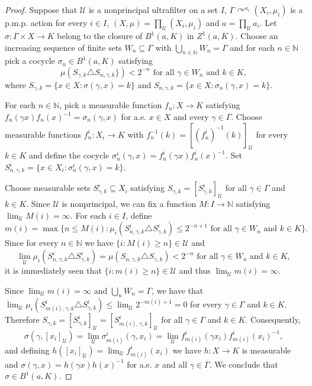 \documentclass[12pt]{amsart}
\theoremstyle{definition}
\def\u{\mathsf 1}
\newcommand\bN{{\mathbb N}}
\def \u{\mathcal U}
\newcommand{\pmp}{p{$.$}m{$.$}p{$.$}}
\newcommand{\acts}{\curvearrowright}
\newcommand{\symd}{\triangle}
\begin{document}
\begin{proof}
	Suppose that $\u$ is a nonprincipal ultrafilter on a set $I$, $\Gamma \acts^{a_i} (X_i, \mu_i)$ is a {\pmp} action for every $i \in I$, $(X, \mu) = \prod_\u (X_i, \mu_i)$ and $a = \prod_\u a_i$. Let $\sigma : \Gamma \times X \rightarrow K$ belong to the closure of $B^1(a, K)$ in $Z^1(a, K)$. Choose an increasing sequence of finite sets $W_n \subseteq \Gamma$ with $\bigcup_{n \in \bN} W_n = \Gamma$ and for each $n \in \bN$ pick a cocycle $\sigma_n \in B^1(a,K)$ satisfying
	$$ \mu(S_{\gamma,k} \symd S_{n,\gamma,k}\}) < 2^{-n} \text{ for all }\gamma \in W_n \text{ and } k \in K, $$
	where $S_{\gamma, k} = \{x \in X : \sigma(\gamma, x) = k\}$ and $S_{n,\gamma,k} = \{x \in X : \sigma_n(\gamma, x) = k\}$.
	
	For each $n \in \bN$, pick a measurable function $f_n : X \rightarrow K$ satisfying $f_n(\gamma x) f_n(x)^{-1} = \sigma_n(\gamma, x)$ for a.e. $x \in X$ and every $\gamma \in \Gamma$. Choose measurable functions $f_n^i : X_i \rightarrow K$ with $f_n^{-1}(k) = [(f_n^i)^{-1}(k)]_\u$ for every $k \in K$ and define the cocycle $\sigma_n^i(\gamma, x) = f_n^i(\gamma x) f_n^i(x)^{-1}$. Set $S_{n,\gamma,k}^i = \{x \in X_i : \sigma_n^i(\gamma, x) = k\}$.
	
	Choose measurable sets $S_{\gamma,k}^i \subseteq X_i$ satisfying $S_{\gamma,k} = [S_{\gamma,k}^i]_\u$ for all $\gamma \in \Gamma$ and $k \in K$. Since $\u$ is nonprincipal, we can fix a function $M : I \rightarrow \bN$ satisfying $\lim_\u M(i) = \infty$. For each $i \in I$, define
	$$m(i) = \max\{n \leq M(i) :  \mu_i(S_{n,\gamma,k}^i \symd S_{\gamma,k}^i) \leq 2^{-n+1} \text{ for all }\gamma \in W_n \text{ and } k \in K\}.$$
	Since for every $n \in \bN$ we have $\{i : M(i) \geq n\} \in \u$ and
	$$\lim_\u \mu_i(S_{n,\gamma,k}^i \symd S_{\gamma,k}^i) = \mu(S_{n,\gamma,k} \symd S_{\gamma,k}) < 2^{-n} \text{ for all }\gamma \in W_n \text{ and } k \in K,$$
	it is immediately seen that $\{i : m(i) \geq n\} \in \u$ and thus $\lim_\u m(i) = \infty$.
	
	Since $\lim_\u m(i) = \infty$ and $\bigcup_n W_n = \Gamma$, we have that $\lim_\u \mu_i(S_{m(i),\gamma,k}^i \symd S_{\gamma,k}^i) \leq \lim_\u 2^{-m(i)+1} = 0$ for every $\gamma \in \Gamma$ and $k \in K$. Therefore $S_{\gamma,k} = [S_{\gamma,k}^i]_\u = [S_{m(i),\gamma,k}^i]_\u$ for all $\gamma \in \Gamma$ and $k \in K$. Consequently,
	$$\sigma(\gamma, [x_i]_\u) = \lim_\u \sigma_{m(i)}^i(\gamma,x_i) = \lim_\u f_{m(i)}^i(\gamma x_i) f_{m(i)}^i(x_i)^{-1},$$
	and defining $h([x_i]_\u) = \lim_\u f_{m(i)}^i(x_i)$ we have $h : X \rightarrow K$ is measurable and $\sigma(\gamma, x) = h(\gamma x) h(x)^{-1}$ for a.e. $x$ and all $\gamma \in \Gamma$. We conclude that $\sigma \in B^1(a,K)$.\qedhere
\end{proof}	
\end{document}
